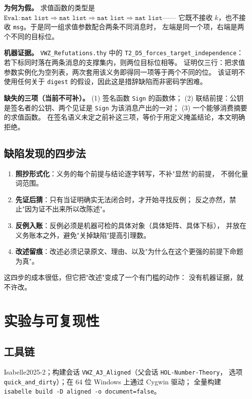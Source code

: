 \documentclass[UTF8,fontset=windows,zihao=-4,a4paper]{ctexart}
\newcommand{\code}[1]{\texttt{#1}}
\begin{document}
\textbf{为何为假。} 求值函数的类型是
$\code{Eval} : \code{nat list} \Rightarrow \code{nat list} \Rightarrow \code{nat list} \Rightarrow \code{nat list}$——
它既不接收 $k$，也不接收 \code{msg}。于是同一组求值参数配合两条不同消息时，
左端是同一个项，右端是两个不同的目标位。

\textbf{机器证据。} \code{VWZ\_Refutations.thy} 中的
\code{T2\_D5\_}\allowbreak\code{forces\_}\allowbreak\code{target\_independence}：
若下标同时落在两条消息的支撑集内，则两位目标位相等。
证明仅三行：把求值参数实例化为空列表，两次套用该义务即得同一项等于两个不同的位。
该证明不使用任何关于 \code{digest} 的假设，因此这是措辞缺陷而非密码学困难。

\textbf{缺失的三项（当前不可补）。} (1) 签名函数 \code{Sign} 的函数体；
(2) 联结前提：公钥是签名者的公钥、两个见证是 \code{Sign} 为该消息产出的一对；
(3) 一个能够消费摘要的求值函数。
在签名语义未定之前补这三项，等价于用定义掩盖结论，本文明确拒绝。

\subsection{缺陷发现的四步法}
\label{sec:method}
\begin{enumerate}
  \item \textbf{照抄形式化}：义务的每个前提与结论逐字转写，不补"显然"的前提，
        不弱化量词范围。
  \item \textbf{先证后猜}：只有当证明确实无法闭合时，才开始寻找反例；
        反之亦然，禁止"因为证不出来所以改陈述"。
  \item \textbf{反例入账}：反例必须是机器可检的具体对象（具体矩阵、具体下标），
        并放在义务账本之外，避免"关掉缺陷"提高引理数。
  \item \textbf{改述留痕}：改述必须记录原文、理由、以及"为什么在这个更强的前提下命题为真"。
\end{enumerate}
这四步的成本很低，但它把"改述"变成了一个有门槛的动作：
没有机器证据，就不许改。

\section{实验与可复现性}

\subsection{工具链}
Isabelle2025-2；构建会话 \code{VWZ\_A3\_Aligned}（父会话 \code{HOL-Number-Theory}，
选项 \code{quick\_and\_dirty}）；在 64 位 Windows 上通过 Cygwin 驱动；
全量构建 \code{isabelle build -D aligned -o document=false}。
\end{document}
